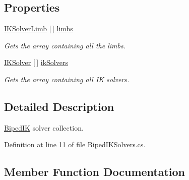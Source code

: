 \subsection*{Properties}
\begin{DoxyCompactItemize}
\item 
\mbox{\hyperlink{class_root_motion_1_1_final_i_k_1_1_i_k_solver_limb}{I\+K\+Solver\+Limb}} \mbox{[}$\,$\mbox{]} \mbox{\hyperlink{class_root_motion_1_1_final_i_k_1_1_biped_i_k_solvers_a3e09348fdc53638bb89bcdd04b2d8b3e}{limbs}}
\begin{DoxyCompactList}\small\item\em Gets the array containing all the limbs. \end{DoxyCompactList}\item 
\mbox{\hyperlink{class_root_motion_1_1_final_i_k_1_1_i_k_solver}{I\+K\+Solver}} \mbox{[}$\,$\mbox{]} \mbox{\hyperlink{class_root_motion_1_1_final_i_k_1_1_biped_i_k_solvers_a7bdb40fe87d56718f82b393af436c57d}{ik\+Solvers}}
\begin{DoxyCompactList}\small\item\em Gets the array containing all IK solvers. \end{DoxyCompactList}\end{DoxyCompactItemize}


\subsection{Detailed Description}
\mbox{\hyperlink{class_root_motion_1_1_final_i_k_1_1_biped_i_k}{Biped\+IK}} solver collection. 



Definition at line 11 of file Biped\+I\+K\+Solvers.\+cs.



\subsection{Member Function Documentation}
\mbox{\label{class_root_motion_1_1_final_i_k_1_1_biped_i_k_solvers_abdda5a3c402e14305b58a90c82eefc49}} 
